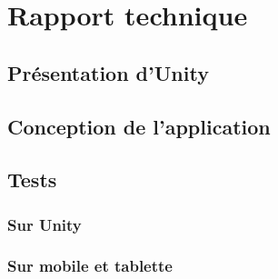 \section{Rapport technique}

\subsection{Présentation d'Unity}


\subsection{Conception de l'application}




\subsection{Tests}
\subsubsection{Sur Unity}
\subsubsection{Sur mobile et tablette}